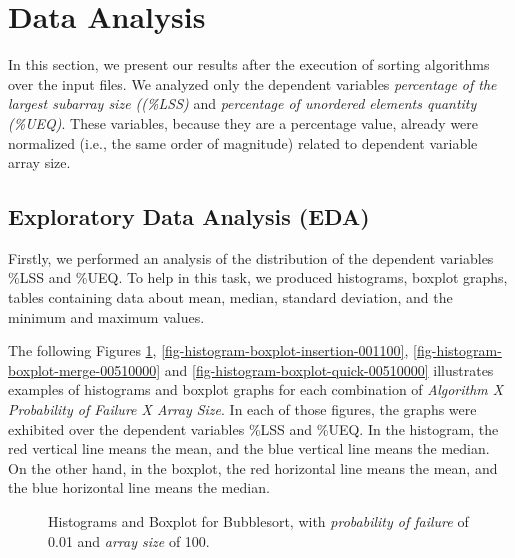 \section{Data Analysis}

In this section, we present our results after the execution of sorting algorithms over the input files. We analyzed only the dependent variables \textit{percentage of the largest subarray size ((\%LSS)} and \textit{percentage of unordered elements quantity (\%UEQ)}. These variables, because they are a percentage value, already were normalized (i.e., the same order of magnitude) related to dependent variable array size.

\subsection{Exploratory Data Analysis (EDA)}

Firstly, we performed an analysis of the distribution of the dependent variables \%LSS and \%UEQ. To help in this task, we produced histograms, boxplot graphs, tables containing data about mean, median, standard deviation, and the minimum and maximum values.

The following Figures \ref{fig-histogram-boxplot-bubble-001100}, \ref{fig-histogram-boxplot-insertion-001100}, \ref{fig-histogram-boxplot-merge-00510000} and \ref{fig-histogram-boxplot-quick-00510000} illustrates examples of histograms and boxplot graphs for each combination of \textit{Algorithm X Probability of Failure X Array Size}. In each of those figures, the graphs were exhibited over the dependent variables \%LSS and \%UEQ.  In the histogram, the red vertical line means the mean, and the blue vertical line means the median. On the other hand, in the boxplot, the red horizontal line means the mean, and the blue horizontal line means the median.

\begin{figure}[H]
    \centering
    \caption{Histograms and Boxplot for Bubblesort, with \textit{probability of failure} of 0.01 and \textit{array size} of 100.}
    \label{fig-histogram-boxplot-bubble-001100}
\end{figure}

